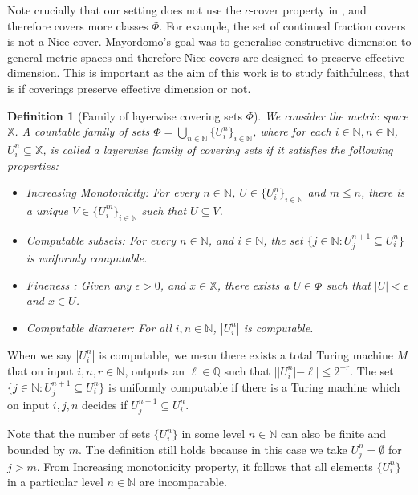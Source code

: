 \documentclass[11pt]{article}
\newtheorem{definition}{Definition}
\newcommand{\N}{\mathbb{N}}
\newcommand{\Q}{\mathbb{Q}}
\newcommand{\X}{{\mathbb{X}}}
\newcommand{\U}{U}
\newcommand{\defPhi}{\bigcup_{n \in \N}\{U_i^n\}_{i \in
		\N}}
\newcommand{\x}{x}
\begin{document}
Note crucially that our setting does not use the $c$-cover property in \cite{Mayordomo2018}, and therefore covers more classes $\Phi$. For example, the set of continued fraction covers is not a Nice cover. Mayordomo's goal was to generalise constructive dimension to general metric spaces and therefore Nice-covers are designed to preserve effective dimension. This is important as the aim of this work is to study faithfulness, that is if coverings preserve effective dimension or not.

\begin{definition} [Family of layerwise covering sets $\Phi$] \label{def:Phi} We
	consider the metric space $\X$. A
	countable family of sets $\Phi = \defPhi$, where for
	each $i \in \N ,n \in \N$, $\U_i^n \subseteq \X$, is called a \emph{layerwise family of covering sets} if it satisfies the following
	properties:
	
	\begin{itemize}	
		\item  Increasing Monotonicity: For every $n \in \N$, $U \in \{U_i^n\}_{i \in \N}$ and $m \leq n$, there is a unique $V \in \{U_i^m\}_{i \in \N}$ such that $U \subseteq V$. 
		
		\item Computable subsets: For every $n \in \N$, and $i \in \N$, the set $\{j \in \N : U_j^{n+1} \subseteq U_i^n\}$ is uniformly computable. 
		
		\item Fineness : Given any $\epsilon > 0$, and $\x \in \X$, there
		exists a $\U \in \Phi$ such that $|U| < \epsilon$ and $x \in \U$.
		
		\item Computable diameter: For all $i,n \in \N$, $|U_i^n|$ is computable.
	\end{itemize}
\end{definition}

When we say $|U_i^n|$ is computable, we mean there exists a total Turing machine $M$ that  on input $i,n,r \in \N$, outputs an $\ell \in \Q$ such that $||U_i^n| - \ell | \leq 2^{-r}$. The set $\{j \in \N : U_j^{n+1} \subseteq U_i^n\}$ is uniformly computable if there is a Turing machine which on input $i,j,n$ decides if $U_j^{n+1}  \subseteq U_i^n$.

Note that the number of sets $\{U_i^n\}$ in some level $n \in \N$ can also be finite and bounded by $m$. The definition still holds because in this case we take $U_j^n = \emptyset$ for $j > m$. From Increasing monotonicity property, it follows that all elements $\{U_i^n\}$ in a particular level $n \in \N$ are incomparable.
\end{document}
